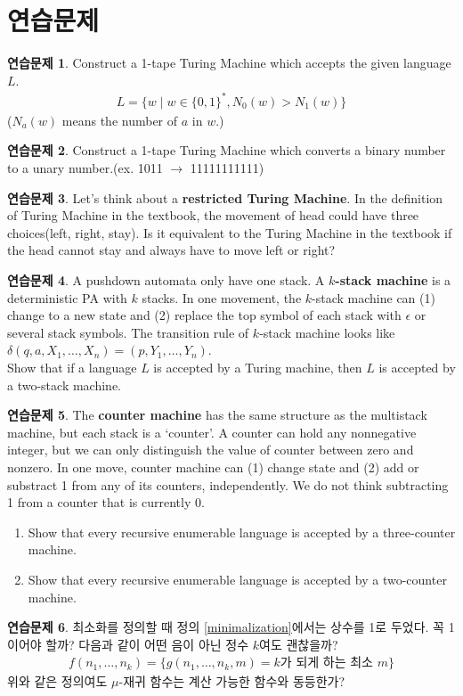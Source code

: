 \documentclass[b5paper, 11pt]{book}
\theoremstyle{definition}
\newtheorem{ec}{연습문제}[chapter]
\begin{document}
\section{연습문제}
\begin{ec}
    Construct a 1-tape Turing Machine which accepts the given language $L$.
    \begin{align*}
        L = \{w \;\vert\; w \in \{0,1\}^*, N_0(w) > N_1(w) \}
    \end{align*}
    ($N_a(w)$ means the number of $a$ in $w$.)
\end{ec}
\begin{ec}
    Construct a 1-tape Turing Machine which converts a binary number to 
    a unary number.(ex. 1011 $\rightarrow$ 11111111111)
\end{ec}
\begin{ec}
    Let's think about a \textbf{restricted Turing Machine}. 
    In the definition of Turing Machine in the textbook, 
    the movement of head could have three choices(left, right, stay). 
    Is it equivalent to the Turing Machine in the textbook if the head 
    cannot stay and always have to move left or right?
\end{ec}
\begin{ec}
    A pushdown automata only have one stack. A \textbf{$k$-stack machine} is 
    a deterministic PA with $k$ stacks. In one movement, the $k$-stack machine 
    can (1) change to a new state and (2) replace the top symbol of each stack
     with $\epsilon$ or several stack symbols. The transition rule of $k$-stack
      machine looks like $\delta(q, a, X_1, \ldots, X_n) = (p, Y_1, \ldots, Y_n)$.
    \\
    Show that if a language $L$ is accepted by a Turing machine, then $L$ is
     accepted by a two-stack machine.
\end{ec}
\begin{ec}
    The \textbf{counter machine} has the same structure as the multistack machine, 
    but each stack is a `counter'. A counter can hold any nonnegative integer, but 
    we can only distinguish the value of counter between zero and nonzero. In one
     move, counter machine can (1) change state and (2) add or substract 1 from any
      of its counters, independently. We do not think subtracting 1 from a counter 
      that is currently 0. 
      \begin{enumerate}
        \item Show that every recursive enumerable language is accepted by 
        a three-counter machine.
        \item Show that every recursive enumerable language is accepted by 
        a two-counter machine.
      \end{enumerate}
\end{ec}
\begin{ec}
    최소화를 정의할 때 정의 \ref{minimalization}에서는 상수를 1로 두었다. 
    꼭 1이어야 할까? 다음과 같이 어떤 음이 아닌 정수 $k$여도 괜찮을까?
    \begin{align*}
        f(n_1, \ldots, n_k) = \{g(n_1, \ldots, n_k, m) = k\text{가 되게 하는 최소 } m\}
    \end{align*}
    위와 같은 정의여도 $\mu$-재귀 함수는 계산 가능한 함수와 동등한가?
\end{ec}
\end{document}
